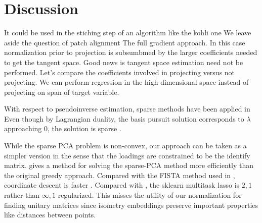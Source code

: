 \section{Discussion}
\label{sec:discussion}


It could be used in the stiching step of an algorithm like the kohli one
We leave aside the question of patch alignment 
The full gradient approach.
In this case normalization prior to projection is subsumbmed by the larger coefficients needed to get the tangent space.
Good news is tangent space estimation need not be performed.
Let's compare the coefficients involved in projecting versus not projecting.
We can perform regression in the high dimensional space instead of projecting on span of target variable.

With respect to pseudoinverse estimation, sparse methods have been applied in \cite{Sun2012-vp}
Even though by Lagrangian duality, the basis pursuit solution corresponds to $\lambda$ approaching $0$, the solution is sparse \cite{Tropp04-ju}.


While the sparse PCA problem is non-convex, our approach can be taken as a simpler version in the sense that the loadings are constrained to be the identify matrix.
\cite{Bertsimas2022-qo} gives a method for solving the sparse-PCA method more efficiently than the original greedy approach.
Compared with the FISTA method used in  \cite{Koelle2022-ju, Koelle2024-no}, coordinate descent \cite{Friedman-2007-yb, Meier2008-ts, Qin2013-tx} is faster \cite{Catalina2018-ek, Zhao2023-xn}.
Compared with \cite{Tropp06-sg, Liu2009-yo}, the sklearn multitask lasso is $2,1$ rather than $\infty,1$ regularized.
This misses the utility of our normalization for finding unitary matrices since isometry embeddings preserve important properties like distances between points.

